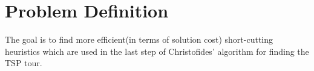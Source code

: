 \chapter{Problem Definition}

The goal is to find more efficient(in terms of solution cost) short-cutting heuristics which are used in the last step of Christofides' algorithm for finding the TSP tour.

